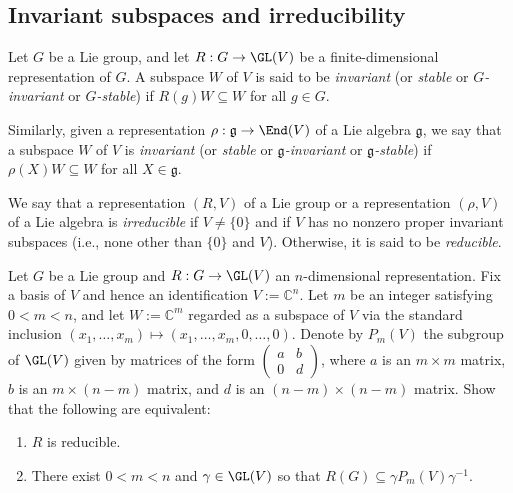 \documentclass[reqno]{amsart} 
\begin{document}
\subsection{Invariant subspaces and irreducibility\label{sec:stability-subspaces}}
\label{sec:orgfac8ca7}
\begin{definition}
  Let $G$  be a Lie group,
  and let $R : G \rightarrow \GL(V)$ be a finite-dimensional
  representation of $G$.
  A subspace $W$ of $V$ is said to be \emph{invariant} (or \emph{stable} or \emph{$G$-invariant} or \emph{$G$-stable})
  if $R(g) W \subseteq  W$ for all $g \in G$.

  Similarly, given a representation
  $\rho : \mathfrak{g} \rightarrow \End(V)$ of a Lie algebra
  $\mathfrak{g}$, we say that a subspace $W$ of $V$ is
  \emph{invariant} (or \emph{stable} or
  \emph{$\mathfrak{g}$-invariant} or
  \emph{$\mathfrak{g}$-stable}) if $\rho(X) W \subseteq W$ for
  all $X \in \mathfrak{g}$.

  We say that a representation $(R,V)$ of a Lie group
  or a representation $(\rho,V)$ of a Lie algebra
  is \emph{irreducible}
  if $V \neq \{0\}$
  and if $V$ has no nonzero proper invariant subspaces
  (i.e., none other than $\{0\}$ and $V$).
  Otherwise, it is said to be \emph{reducible}.
\end{definition}
\begin{exercise}
  Let $G$ be a Lie group
  and $R : G \rightarrow \GL(V)$ an $n$-dimensional
  representation.
  Fix
  a basis of $V$ and hence an identification
  $V := \mathbb{C}^n$.
  Let $m$ be an integer satisfying $0 < m < n$,
  and let $W := \mathbb{C}^m$
  regarded as
  a subspace of $V$ via the standard inclusion
  $(x_1,\dotsc,x_m) \mapsto (x_1,\dotsc,x_m,0,\dotsc,0)$.
  Denote by $P_m(V)$ the subgroup of $\GL(V)$ given by
  matrices of the form
  $
\begin{pmatrix}
    a & b \\
    0 & d
  \end{pmatrix}
$,
  where $a$ is an $m \times m$ matrix,
  $b$ is an $m \times (n-m)$ matrix,
  and $d$ is an $(n-m) \times (n-m)$ matrix.
  Show that the following are equivalent:
  \begin{enumerate}
  \item $R$ is reducible.
  \item
    There exist $0 < m < n$ and $\gamma \in \GL(V)$
    so that $R(G) \subseteq \gamma P_m(V) \gamma^{-1}$.
  \end{enumerate}
\end{exercise}
\end{document}
